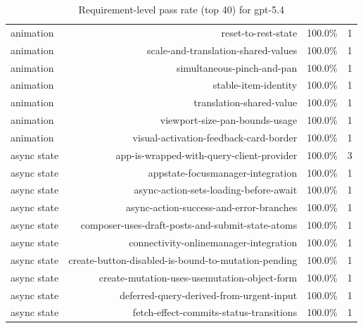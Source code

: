 \begin{table}[htbp]
\begin{tabular}{lrrr}
animation & reset-to-rest-state & 100.0\% & 1 \\
animation & scale-and-translation-shared-values & 100.0\% & 1 \\
animation & simultaneous-pinch-and-pan & 100.0\% & 1 \\
animation & stable-item-identity & 100.0\% & 1 \\
animation & translation-shared-value & 100.0\% & 1 \\
animation & viewport-size-pan-bounds-usage & 100.0\% & 1 \\
animation & visual-activation-feedback-card-border & 100.0\% & 1 \\
async state & app-is-wrapped-with-query-client-provider & 100.0\% & 3 \\
async state & appstate-focusmanager-integration & 100.0\% & 1 \\
async state & async-action-sets-loading-before-await & 100.0\% & 1 \\
async state & async-action-success-and-error-branches & 100.0\% & 1 \\
async state & composer-uses-draft-posts-and-submit-state-atoms & 100.0\% & 1 \\
async state & connectivity-onlinemanager-integration & 100.0\% & 1 \\
async state & create-button-disabled-is-bound-to-mutation-pending & 100.0\% & 1 \\
async state & create-mutation-uses-usemutation-object-form & 100.0\% & 1 \\
async state & deferred-query-derived-from-urgent-input & 100.0\% & 1 \\
async state & fetch-effect-commits-status-transitions & 100.0\% & 1 \\
\bottomrule
\end{tabular}
\caption{Requirement-level pass rate (top 40) for gpt-5.4}
\end{table}
